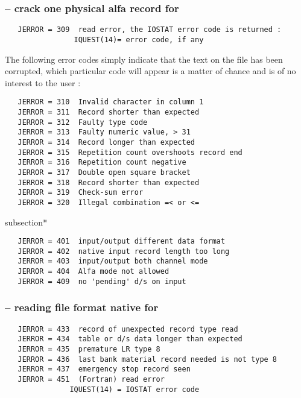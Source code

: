 \subsubsection*{ -- crack one physical alfa record for }

\begin{verbatim}
   JERROR = 309  read error, the IOSTAT error code is returned :
                IQUEST(14)= error code, if any
\end{verbatim}

   The following error codes simply indicate that the text on the file
   has been corrupted, which particular code will appear is a matter
   of chance and is of no interest to the user :

\begin{verbatim}
   JERROR = 310  Invalid character in column 1
   JERROR = 311  Record shorter than expected
   JERROR = 312  Faulty type code
   JERROR = 313  Faulty numeric value, > 31
   JERROR = 314  Record longer than expected
   JERROR = 315  Repetition count overshoots record end
   JERROR = 316  Repetition count negative
   JERROR = 317  Double open square bracket
   JERROR = 318  Record shorter than expected
   JERROR = 319  Check-sum error
   JERROR = 320  Illegal combination =< or <=
\end{verbatim}

subsection*{}

\begin{verbatim}
   JERROR = 401  input/output different data format
   JERROR = 402  native input record length too long
   JERROR = 403  input/output both channel mode
   JERROR = 404  Alfa mode not allowed
   JERROR = 409  no 'pending' d/s on input
\end{verbatim}

\subsubsection*{ -- reading file format native for }

\begin{verbatim}
   JERROR = 433  record of unexpected record type read
   JERROR = 434  table or d/s data longer than expected
   JERROR = 435  premature LR type 8
   JERROR = 436  last bank material record needed is not type 8
   JERROR = 437  emergency stop record seen
   JERROR = 451  (Fortran) read error
               IQUEST(14) = IOSTAT error code
\end{verbatim}

